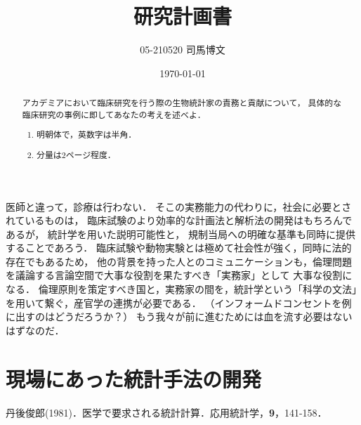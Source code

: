 \documentclass[uplatex, dvipdfmx]{jsarticle}
\title{研究計画書}
\author{05-210520 司馬博文}
\date{\today}
\begin{document}
\begin{abstract}
    アカデミアにおいて臨床研究を行う際の生物統計家の責務と貢献について，
    具体的な臨床研究の事例に即してあなたの考えを述べよ．
    \begin{enumerate}
        \item 明朝体で，英数字は半角．
        \item 分量は2ページ程度．
    \end{enumerate}
\end{abstract}

医師と違って，診療は行わない．
そこの実務能力の代わりに，社会に必要とされているものは，
臨床試験のより効率的な計画法と解析法の開発はもちろんであるが，
統計学を用いた説明可能性と，
規制当局への明確な基準も同時に提供することであろう．
臨床試験や動物実験とは極めて社会性が強く，同時に法的存在でもあるため，
他の背景を持った人とのコミュニケーションも，倫理問題を議論する言論空間で大事な役割を果たすべき「実務家」として
大事な役割になる．
倫理原則を策定すべき国と，実務家の間を，統計学という「科学の文法」を用いて繋ぐ，産官学の連携が必要である．
（インフォームドコンセントを例に出すのはどうだろうか？）
もう我々が前に進むためには血を流す必要はないはずなのだ．

\section{現場にあった統計手法の開発}



\begin{thebibliography}{9}
    丹後俊郎(1981)．医学で要求される統計計算．応用統計学，\textbf{9}，141-158．
\end{thebibliography}
\end{document}
